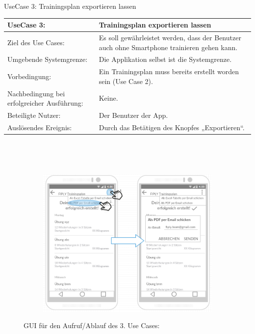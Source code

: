 \documentclass[FIPLY_base.tex]{subfiles}
\begin{document}
	UseCase 3: Trainingsplan exportieren lassen
	\ \\
	\begin{center}
		\def\arraystretch{1.3}%
		\begin{tabular}{| p{5cm} | p{5cm} |}
			\hline
			UseCase 3: & Trainingsplan exportieren lassen \\ \hline 
			Ziel des Use Cases: & Es soll gewährleistet werden, dass der Benutzer auch ohne Smartphone trainieren gehen kann. \\ \hline
			Umgebende Systemgrenze: & Die Applikation selbst ist die Systemgrenze. \\ \hline
			Vorbedingung: & Ein Trainingsplan muss bereits erstellt worden sein (Use Case 2).  \\ \hline
			Nachbedingung bei erfolgreicher Ausführung: & Keine. \\ \hline
			Beteiligte Nutzer: & Der Benutzer der App. \\ \hline
			Auslösendes Ereignis: & Durch das Betätigen des Knopfes „Exportieren“. \\ \hline
		\end{tabular} \\
	\end{center}
		\ \\
	\begin{figure}[H]
		\begin{subfigure}[b]{0.3\textwidth}
			\includegraphics[scale=0.32]{img/Trainingsplanexportieren}
		\end{subfigure}
		\caption{GUI für den Aufruf/Ablauf des 3. Use Cases:}
	\end{figure}
\end{document}
